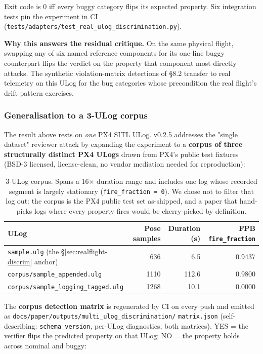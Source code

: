 \documentclass[11pt,a4paper]{article}
\begin{document}
Exit code is 0 iff every buggy category flips its expected
property. Six integration tests pin the experiment in CI
(\texttt{tests/adapters/test\_real\_ulog\_discrimination.py}).

\textbf{Why this answers the residual critique.} On the same
physical flight, swapping any of six named reference components
for its one-line buggy counterpart flips the verdict on the
property that component most directly attacks. The synthetic
violation-matrix detections of \S8.2 transfer to real telemetry
on this ULog for the bug categories whose precondition the real
flight's drift pattern exercises.

\subsubsection*{Generalisation to a 3-ULog corpus}
\label{sec:multi-ulog-corpus}

The result above rests on \emph{one} PX4 SITL ULog. v0.2.5
addresses the "single dataset" reviewer attack by expanding the
experiment to a \textbf{corpus of three structurally distinct
PX4 ULogs} drawn from PX4's public test fixtures (BSD-3 licensed,
license-clean, no vendor mediation needed for reproduction):

\begin{table}[h]
\centering\small
\begin{tabular}{l r r r}
\toprule
\textbf{ULog} & Pose samples & Duration (s) & FPB \texttt{fire\_fraction} \\
\midrule
\texttt{sample.ulg} (the \S\ref{sec:realflight-discrim} anchor) & 636  & 6.5   & 0.9437 \\
\texttt{corpus/sample\_appended.ulg}                            & 1110 & 112.6 & 0.9800 \\
\texttt{corpus/sample\_logging\_tagged.ulg}                     & 1268 & 10.1  & 0.0000 \\
\bottomrule
\end{tabular}
\caption{3-ULog corpus. Spans a 16$\times$ duration range and
includes one log whose recorded segment is largely stationary
(\texttt{fire\_fraction = 0}). We chose not to filter that log
out: the corpus is the PX4 public test set as-shipped, and a
paper that hand-picks logs where every property fires would be
cherry-picked by definition.}
\end{table}

The \textbf{corpus detection matrix} is regenerated by CI on
every push and emitted as
\texttt{docs/paper/outputs/multi\_ulog\_discrimination/}
\texttt{matrix.json} (self-describing: \texttt{schema\_version},
per-ULog diagnostics, both matrices). YES = the verifier flips
the predicted property on that ULog; NO = the property holds
across nominal and buggy:
\end{document}
